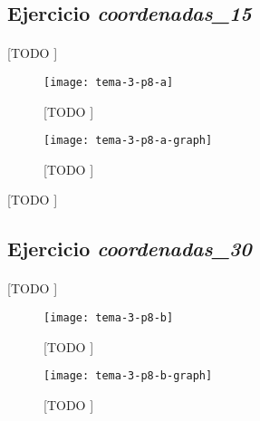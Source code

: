\documentclass[spanish]{article}
\begin{document}
		\subsection{Ejercicio \emph{coordenadas\_15}}
		\label{sec:e-8a}

			\paragraph{}
			[TODO ]

			\begin{figure}[h]
				\begin{center}
					\texttt{[image: tema-3-p8-a]}
				\end{center}
				\caption{[TODO ]}
				\label{}
			\end{figure}

			\begin{figure}[h]
				\begin{center}
					\texttt{[image: tema-3-p8-a-graph]}
				\end{center}
				\caption{[TODO ]}
				\label{}
			\end{figure}

			\begin{table}[h]
				\begin{center}
				\end{center}
				\caption{[TODO ]}
				\label{}
			\end{table}


		\subsection{Ejercicio \emph{coordenadas\_30}}
		\label{sec:e-8b}

			\paragraph{}
			[TODO ]

			\begin{figure}[h]
				\begin{center}
					\texttt{[image: tema-3-p8-b]}
				\end{center}
				\caption{[TODO ]}
				\label{}
			\end{figure}

			\begin{figure}[h]
				\begin{center}
					\texttt{[image: tema-3-p8-b-graph]}
				\end{center}
				\caption{[TODO ]}
				\label{}
			\end{figure}
\end{document}

